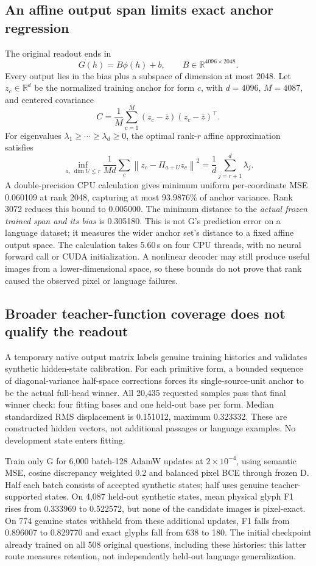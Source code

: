 \documentclass[10pt,a4paper]{article}
\providecommand{\DIFadd}[1]{{\protect\color{blue} \sf #1}} %
\begin{document}
\subsection*{\DIFadd{An affine output span limits exact anchor regression}}
\DIFadd{The original readout ends in
}\[
G(h)=B\phi(h)+b,\qquad B\in\mathbb{R}^{4096\times2048}.
\]
\DIFadd{Every output lies in the bias plus a subspace of dimension at most 2048.
Let $z_c\in\mathbb{R}^d$ be the normalized training anchor for form $c$,
with $d=4096$, $M=4087$, and centered covariance
}\[
C=\frac{1}{M}\sum_{c=1}^M(z_c-\bar z)(z_c-\bar z)^\top.
\]
\DIFadd{For eigenvalues $\lambda_1\geq\cdots\geq\lambda_d\geq0$, the optimal
rank-$r$ affine approximation satisfies
}\[
\inf_{a,\,\dim U\leq r}\frac{1}{Md}\sum_c
 \left\|z_c-\Pi_{a+U}z_c\right\|^2
 =\frac{1}{d}\sum_{j=r+1}^{d}\lambda_j.
\]
\DIFadd{A double-precision CPU calculation gives minimum uniform per-coordinate
MSE 0.060109 at rank 2048, capturing at most 93.9876\% of anchor variance.
Rank 3072 reduces this bound to 0.005000. The minimum distance to the
\emph{actual frozen trained span and its bias} is 0.305180. This is not
G's prediction error on a language dataset; it measures the wider anchor
set's distance to a fixed affine output space. The calculation takes 5.60\,s
on four CPU threads, with no neural forward call or CUDA initialization.
A nonlinear decoder may still produce useful images from a lower-dimensional
space, so these bounds do not prove that rank caused the observed pixel or
language failures.
}

\subsection*{\DIFadd{Broader teacher-function coverage does not qualify the readout}}
\DIFadd{A temporary native output matrix labels genuine training histories and
validates synthetic hidden-state calibration. For each primitive form, a
bounded sequence of diagonal-variance half-space corrections forces its
single-source-unit anchor to be the actual full-head winner. All 20,435
requested samples pass that final winner check: four fitting bases and one
held-out base per form. Median standardized RMS displacement is 0.151012,
maximum 0.323332. These are constructed hidden vectors, not additional
passages or language examples. No development state enters fitting.
}

\DIFadd{Train only G for 6,000 batch-128 AdamW updates at $2\times10^{-4}$, using
semantic MSE, cosine discrepancy weighted 0.2 and balanced pixel BCE through
frozen D. Half each batch consists of accepted synthetic states; half uses
genuine teacher-supported states. On 4,087 held-out synthetic states,
mean physical glyph F1 rises from 0.333969 to 0.522572, but none of the
candidate images is pixel-exact. On 774 genuine states withheld from these
additional updates, F1 falls from 0.896007 to 0.829770 and exact glyphs fall
from 638 to 180. The initial checkpoint already trained on all 508 original
questions, including these histories: this latter route measures retention,
not independently held-out language generalization.
}
\end{document}
